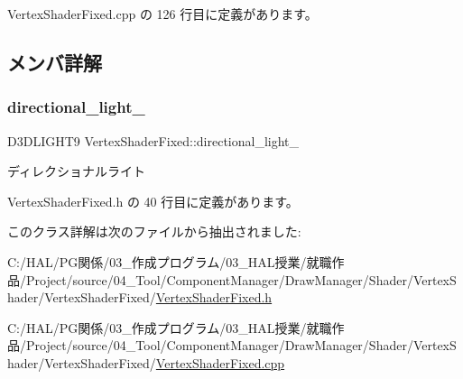  Vertex\+Shader\+Fixed.\+cpp の 126 行目に定義があります。



\subsection{メンバ詳解}
\mbox{\label{class_vertex_shader_fixed_ae2409965de90816f89ba8797880b3cd2}} 
\subsubsection{\texorpdfstring{directional\+\_\+light\+\_\+}{directional\_light\_}}
{\footnotesize\ttfamily D3\+D\+L\+I\+G\+H\+T9 Vertex\+Shader\+Fixed\+::directional\+\_\+light\+\_\+\hspace{0.3cm}{\ttfamily [private]}}



ディレクショナルライト 



 Vertex\+Shader\+Fixed.\+h の 40 行目に定義があります。



このクラス詳解は次のファイルから抽出されました\+:\begin{DoxyCompactItemize}
\item 
C\+:/\+H\+A\+L/\+P\+G関係/03\+\_\+作成プログラム/03\+\_\+\+H\+A\+L授業/就職作品/\+Project/source/04\+\_\+\+Tool/\+Component\+Manager/\+Draw\+Manager/\+Shader/\+Vertex\+Shader/\+Vertex\+Shader\+Fixed/\mbox{\hyperlink{_vertex_shader_fixed_8h}{Vertex\+Shader\+Fixed.\+h}}\item 
C\+:/\+H\+A\+L/\+P\+G関係/03\+\_\+作成プログラム/03\+\_\+\+H\+A\+L授業/就職作品/\+Project/source/04\+\_\+\+Tool/\+Component\+Manager/\+Draw\+Manager/\+Shader/\+Vertex\+Shader/\+Vertex\+Shader\+Fixed/\mbox{\hyperlink{_vertex_shader_fixed_8cpp}{Vertex\+Shader\+Fixed.\+cpp}}\end{DoxyCompactItemize}
